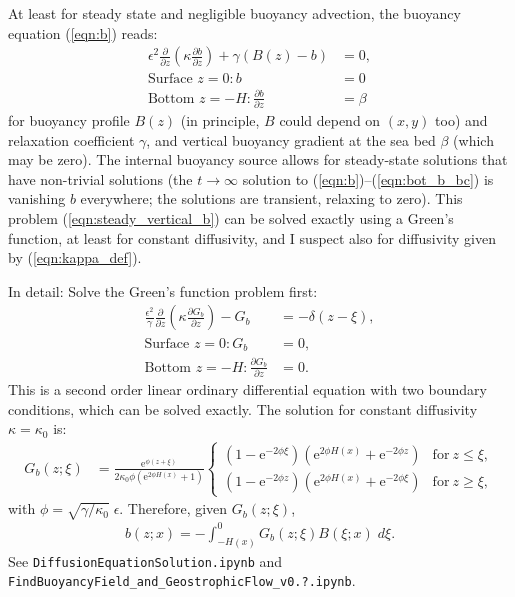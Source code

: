 \documentclass[10pt]{amsart}
\begin{document}
At least for steady state and negligible buoyancy advection, the buoyancy equation (\ref{eqn:b}) reads:
\begin{align}
\epsilon^2 \frac{\partial }{\partial z} \left( \kappa \frac{\partial b}{\partial z} \right) + \gamma \left(  B(z) - b \right) & = 0, \label{eqn:steady_vertical_b} \\
\text{Surface~}z = 0:
b &= 0
 \\
\text{Bottom~}z = -H:
\frac{\partial b}{\partial z} &= \beta
\end{align}
for buoyancy profile $B(z)$ (in principle, $B$ could depend on $(x,y)$ too) and relaxation coefficient $\gamma$, and vertical buoyancy gradient at the sea bed $\beta$ (which may be zero). 
The internal buoyancy source allows for steady-state solutions that have non-trivial solutions (the $t\rightarrow \infty$ solution to (\ref{eqn:b})--(\ref{eqn:bot_b_bc}) is vanishing $b$ everywhere; the \citealt{peterson&callies26} solutions are transient, relaxing to zero).
This problem (\ref{eqn:steady_vertical_b}) can be solved exactly using a Green's function, at least for constant diffusivity, and I suspect also for diffusivity given by (\ref{eqn:kappa_def}). 

In detail: Solve the Green's function problem first:
\begin{align}
\frac{\epsilon^2}{\gamma} \frac{\partial }{\partial z} \left( \kappa \frac{\partial G_b}{\partial z} \right) -  G_b & =  -  \delta(z - \xi) , \label{eqn:Gsfn}\\
\text{Surface~}z = 0:
G_b &= 0 ,
\label{eqn:Gsfn_sfcbc} \\
\text{Bottom~}z = -H:
\frac{\partial G_b}{\partial z} &= 0 .
\label{eqn:Gsfn_botbc}
\end{align}
This is a second order linear ordinary differential equation with two boundary conditions, which can be solved exactly.
The solution for constant diffusivity $\kappa = \kappa_0$ is:
\begin{align}
G_b (z; \xi) & = \frac{\mathrm{e}^{\phi \left(z + \xi\right)}}
{2  \kappa_0 \phi \left(\mathrm{e}^{2 \phi H \left(x \right)} + 1\right)}
\begin{cases} 
\displaystyle \left(1 - \mathrm{e}^{- 2 \phi \xi} \right) \left(\mathrm{e}^{2 \phi H{\left(x \right)}} + \mathrm{e}^{- 2 \phi z  }\right) & \text{for}\: z \leq \xi , \\
\displaystyle \left(1 - \mathrm{e}^{- 2 \phi   z} \right) \left(\mathrm{e}^{2 \phi H{\left(x \right)}} + \mathrm{e}^{- 2 \phi \xi}\right) & \text{for}\: z \geq \xi ,
\end{cases}
\end{align}
with $\phi = \sqrt{\gamma/\kappa_0} \; \epsilon$.
Therefore, given $G_b(z; \xi)$,
\begin{align}
b(z; x) = - \int_{-H(x)}^{0} G_b(z; \xi) B(\xi; x) \; d \xi  .
\end{align}
See \texttt{DiffusionEquationSolution.ipynb} and \texttt{FindBuoyancyField\_and\_GeostrophicFlow\_v0.?.ipynb}.
\end{document}
